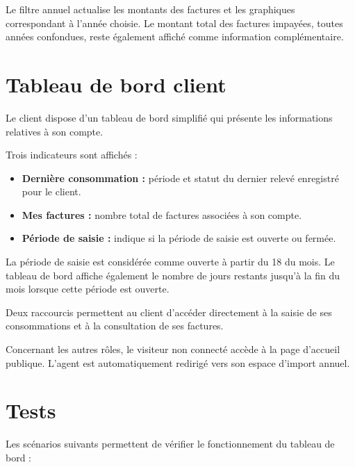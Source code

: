 Le filtre annuel actualise les montants des factures et les graphiques correspondant à l'année choisie. Le montant total des factures impayées, toutes années confondues, reste également affiché comme information complémentaire.

\section{Tableau de bord client}

Le client dispose d'un tableau de bord simplifié qui présente les informations relatives à son compte.

Trois indicateurs sont affichés :

\begin{itemize}
    \item \textbf{Dernière consommation :} période et statut du dernier relevé enregistré pour le client.
    \item \textbf{Mes factures :} nombre total de factures associées à son compte.
    \item \textbf{Période de saisie :} indique si la période de saisie est ouverte ou fermée.
\end{itemize}

La période de saisie est considérée comme ouverte à partir du 18 du mois. Le tableau de bord affiche également le nombre de jours restants jusqu'à la fin du mois lorsque cette période est ouverte.

Deux raccourcis permettent au client d'accéder directement à la saisie de ses consommations et à la consultation de ses factures.

Concernant les autres rôles, le visiteur non connecté accède à la page d'accueil publique. L'agent est automatiquement redirigé vers son espace d'import annuel.

\section{Tests}

Les scénarios suivants permettent de vérifier le fonctionnement du tableau de bord :

